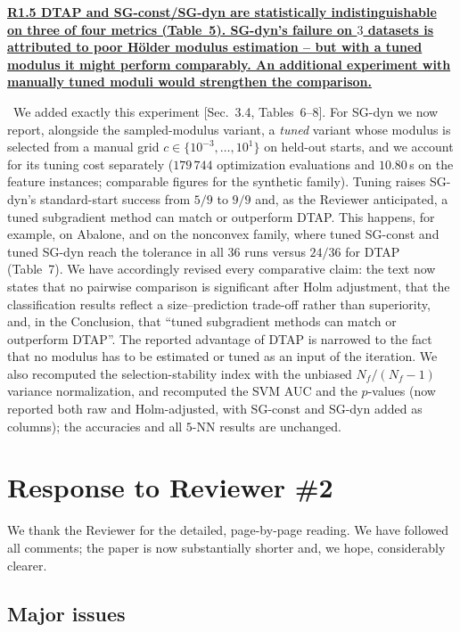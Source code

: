 \documentclass[11pt]{article}
\newcommand{\response}[1]{\smallskip\noindent{\color{blue!60!black}\textbf{Response.}}\ #1\par\medskip}
\newcommand{\loc}[1]{\textcolor{blue!50!black}{[#1]}}
\newenvironment{point}[1]{\medskip\noindent\textbf{\uline{#1}}\par}{\par}
\begin{document}
\begin{point}{R1.5 DTAP and SG-const/SG-dyn are statistically indistinguishable on three of four metrics (Table~5). SG-dyn's failure on $3$ datasets is attributed to poor H\"older modulus estimation -- but with a tuned modulus it might perform comparably. An additional experiment with manually tuned moduli would strengthen the comparison.}
\response{We added exactly this experiment \loc{Sec.~3.4, Tables~6--8}. For SG-dyn we now report, alongside the sampled-modulus variant, a \emph{tuned} variant whose modulus is selected from a manual grid $c\in\{10^{-3},\dots,10^{1}\}$ on held-out starts, and we account for its tuning cost separately ($179\,744$ optimization evaluations and $10.80$\,s on the feature instances; comparable figures for the synthetic family). Tuning raises SG-dyn's standard-start success from $5/9$ to $9/9$ and, as the Reviewer anticipated, a tuned subgradient method can match or outperform DTAP. This happens, for example, on Abalone, and on the nonconvex family, where tuned SG-const and tuned SG-dyn reach the tolerance in all $36$ runs versus $24/36$ for DTAP (Table~7). We have accordingly revised every comparative claim: the text now states that no pairwise comparison is significant after Holm adjustment, that the classification results reflect a size--prediction trade-off rather than superiority, and, in the Conclusion, that ``tuned subgradient methods can match or outperform DTAP''. The reported advantage of DTAP is narrowed to the fact that no modulus has to be estimated or tuned as an input of the iteration. We also recomputed the selection-stability index with the unbiased $N_f/(N_f-1)$ variance normalization, and recomputed the SVM AUC and the $p$-values (now reported both raw and Holm-adjusted, with SG-const and SG-dyn added as columns); the accuracies and all $5$-NN results are unchanged.}
\end{point}

\section*{Response to Reviewer \#2}

\noindent We thank the Reviewer for the detailed, page-by-page reading. We have followed all comments; the paper is now substantially shorter and, we hope, considerably clearer.

\subsection*{Major issues}
\end{document}
